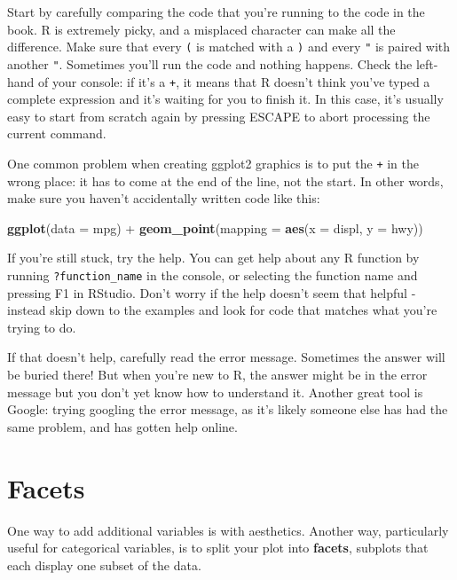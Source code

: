 \documentclass[]{book}
\newenvironment{Shaded}{\begin{snugshade}}{\end{snugshade}}
\newcommand{\KeywordTok}[1]{\textcolor[rgb]{0.13,0.29,0.53}{\textbf{{#1}}}}
\newcommand{\DataTypeTok}[1]{\textcolor[rgb]{0.13,0.29,0.53}{{#1}}}
\newcommand{\StringTok}[1]{\textcolor[rgb]{0.31,0.60,0.02}{{#1}}}
\newcommand{\NormalTok}[1]{{#1}}
\begin{document}
Start by carefully comparing the code that you're running to the code in
the book. R is extremely picky, and a misplaced character can make all
the difference. Make sure that every \texttt{(} is matched with a
\texttt{)} and every \texttt{"} is paired with another \texttt{"}.
Sometimes you'll run the code and nothing happens. Check the left-hand
of your console: if it's a \texttt{+}, it means that R doesn't think
you've typed a complete expression and it's waiting for you to finish
it. In this case, it's usually easy to start from scratch again by
pressing ESCAPE to abort processing the current command.

One common problem when creating ggplot2 graphics is to put the
\texttt{+} in the wrong place: it has to come at the end of the line,
not the start. In other words, make sure you haven't accidentally
written code like this:

\begin{Shaded}
\begin{Highlighting}[]
\KeywordTok{ggplot}\NormalTok{(}\DataTypeTok{data =} \NormalTok{mpg) }
\NormalTok{+}\StringTok{ }\KeywordTok{geom_point}\NormalTok{(}\DataTypeTok{mapping =} \KeywordTok{aes}\NormalTok{(}\DataTypeTok{x =} \NormalTok{displ, }\DataTypeTok{y =} \NormalTok{hwy))}
\end{Highlighting}
\end{Shaded}

If you're still stuck, try the help. You can get help about any R
function by running \texttt{?function\_name} in the console, or
selecting the function name and pressing F1 in RStudio. Don't worry if
the help doesn't seem that helpful - instead skip down to the examples
and look for code that matches what you're trying to do.

If that doesn't help, carefully read the error message. Sometimes the
answer will be buried there! But when you're new to R, the answer might
be in the error message but you don't yet know how to understand it.
Another great tool is Google: trying googling the error message, as it's
likely someone else has had the same problem, and has gotten help
online.

\section{Facets}\label{facets}

One way to add additional variables is with aesthetics. Another way,
particularly useful for categorical variables, is to split your plot
into \textbf{facets}, subplots that each display one subset of the data.
\end{document}
